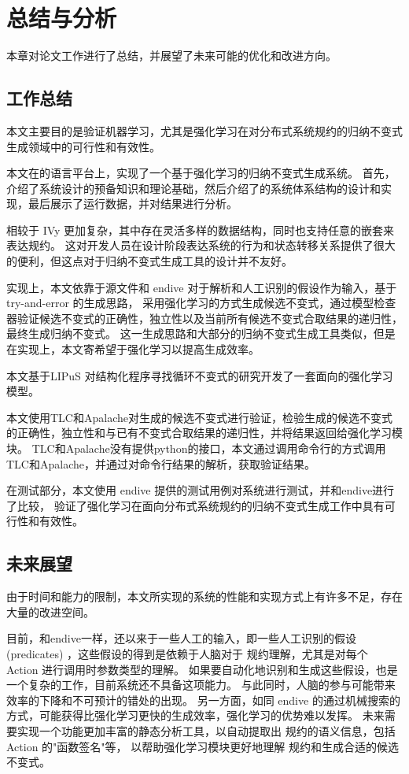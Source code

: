 \chapter{总结与分析}\label{chap:conclusion}
本章对论文工作进行了总结，并展望了未来可能的优化和改进方向。
\section{工作总结}
本文主要目的是验证机器学习，尤其是强化学习在对分布式系统规约的归纳不变式生成领域中的可行性和有效性。

本文在\TLA 的语言平台上，实现了一个基于强化学习的归纳不变式生成系统。
首先，介绍了系统设计的预备知识和理论基础，然后介绍了\rltla 的系统体系结构的设计和实现，最后展示了运行数据，并对结果进行分析。

\TLA 相较于 IVy 更加复杂，其中存在灵活多样的数据结构，同时也支持任意的嵌套来表达规约。
这对开发人员在设计阶段表达系统的行为和状态转移关系提供了很大的便利，但这点对于归纳不变式生成工具的设计并不友好。

实现上，本文依靠于\TLA 源文件和 endive 对于\TLA 解析和人工识别的假设作为输入，基于 try-and-error 的生成思路，
采用强化学习的方式生成候选不变式，通过模型检查器验证候选不变式的正确性，独立性以及当前所有候选不变式合取结果的递归性，最终生成归纳不变式。
这一生成思路和大部分的归纳不变式生成工具类似，但是在实现上，本文寄希望于强化学习以提高生成效率。

本文基于LIPuS \cite{LIPuS} 对结构化程序寻找循环不变式的研究开发了一套面向\TLA 的强化学习模型。

本文使用TLC和Apalache对生成的候选不变式进行验证，检验生成的候选不变式的正确性，独立性和与已有不变式合取结果的递归性，并将结果返回给强化学习模块。
TLC和Apalache没有提供python的接口，本文通过调用命令行的方式调用TLC和Apalache，并通过对命令行结果的解析，获取验证结果。

在测试部分，本文使用 endive 提供的测试用例对系统进行测试，并和endive进行了比较，
验证了强化学习在面向分布式系统规约的归纳不变式生成工作中具有可行性和有效性。

\section{未来展望}
由于时间和能力的限制，本文所实现的系统的性能和实现方式上有许多不足，存在大量的改进空间。

目前，和endive一样，\rltla 还以来于一些人工的输入，即一些人工识别的假设(predicates)
，这些假设的得到是依赖于人脑对于 \TLA 规约理解，尤其是对每个 Action 进行调用时参数类型的理解。
如果要自动化地识别和生成这些假设，也是一个复杂的工作，目前系统还不具备这项能力。
与此同时，人脑的参与可能带来效率的下降和不可预计的错处的出现。
另一方面，如同 endive 的通过机械搜索的方式，可能获得比强化学习更快的生成效率，强化学习的优势难以发挥。
未来需要实现一个功能更加丰富的静态分析工具，以自动提取出 \TLA 规约的语义信息，包括 Action 的"函数签名"等，
以帮助强化学习模块更好地理解 \TLA 规约和生成合适的候选不变式。

